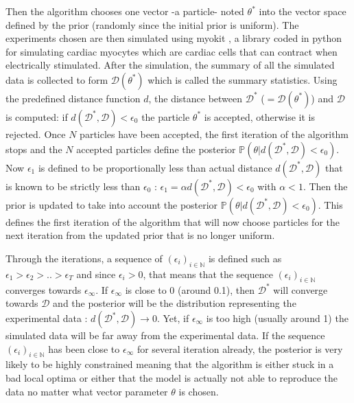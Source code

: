 \documentclass[11pt]{report}
\begin{document}
Then the algorithm chooses one vector -a particle- noted $\theta^{*}$ into the vector space defined by the prior (randomly since the initial prior is uniform). The experiments chosen are then simulated using myokit \cite{Clerx2016}, a library coded in python for simulating cardiac myocytes which are cardiac cells that can contract when electrically stimulated. After the simulation, the summary of all the simulated data is collected to form  $\mathcal{D}(\theta^{*})$ which is called the summary statistics. Using the predefined distance function $d$, the distance between $ \mathcal{D}^{*}$ ($= \mathcal{D}(\theta^{*})$) and $\mathcal{D}$ is computed: if $d(\mathcal{D}^{*},\mathcal{D}) < \epsilon_0 $ the particle $\theta^{*}$ is accepted, otherwise it is rejected. Once $N$ particles have been accepted, the first iteration of the algorithm stops and the $N$ accepted particles define the posterior $\mathbb{P}(\theta | d(\mathcal{D}^{*},\mathcal{D}) < \epsilon_0)$. Now $\epsilon_1$ is defined to be proportionally less than actual distance $d(\mathcal{D}^{*},\mathcal{D})$ that is known to be strictly less than $\epsilon_0$ : $\epsilon_1 = \alpha d(\mathcal{D}^{*},\mathcal{D}) < \epsilon_0$ with $\alpha < 1$. Then the prior is updated to take into account the posterior $\mathbb{P}(\theta | d(\mathcal{D}^{*},\mathcal{D}) < \epsilon_0)$. This defines the first iteration of the algorithm that will now choose particles for the next iteration from the updated prior that is no longer uniform.

Through the iterations, a sequence of $(\epsilon_i)_{i \in \mathbb{N}}$ is defined such as $\epsilon_{1}>\epsilon_{2}>..>\epsilon_{T}$ and since $\epsilon_{i} > 0$, that means that the sequence $(\epsilon_i)_{i \in \mathbb{N}}$ converges towards $\epsilon_{\infty}$. If $\epsilon_{\infty}$ is close to 0 (around 0.1), then $\mathcal{D}^{*}$ will converge towards $\mathcal{D}$ and the posterior will be the distribution representing the experimental data : $d(\mathcal{D}^{*},\mathcal{D}) \rightarrow 0$. Yet, if $\epsilon_{\infty}$ is too high (usually around 1) the simulated data will be far away from the experimental data. If the sequence $(\epsilon_i)_{i \in \mathbb{N}}$ has been close to $\epsilon_{\infty}$ for several iteration already, the posterior is very likely to be highly constrained meaning that the algorithm is either stuck in a bad local optima or either that the model is actually not able to reproduce the data no matter what vector parameter $\theta$ is chosen.
\end{document}
